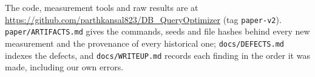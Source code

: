 \documentclass[conference]{IEEEtran}
\begin{document}
The code, measurement tools and raw results are at
\url{https://github.com/parthkansal823/DB_QueryOptimizer} (tag
\texttt{paper-v2}). \texttt{paper/ARTIFACTS.md} gives the commands, seeds and
file hashes behind every new measurement and the provenance of every historical
one; \texttt{docs/DEFECTS.md} indexes the defects, and \texttt{docs/WRITEUP.md}
records each finding in the order it was made, including our own errors.



\end{document}
